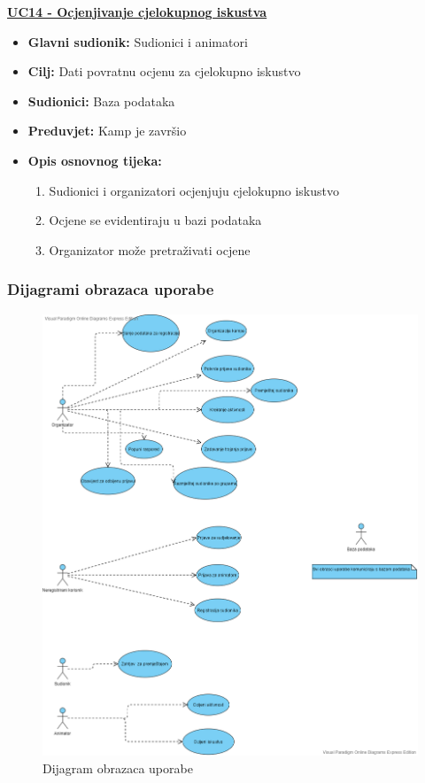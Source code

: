 \noindent \underline{\textbf{UC14 - Ocjenjivanje cjelokupnog iskustva}}
\begin{itemize}
	\item \textbf{Glavni sudionik:} Sudionici i animatori
	\item \textbf{Cilj:} Dati povratnu ocjenu za cjelokupno iskustvo
	\item \textbf{Sudionici:} Baza podataka
	\item \textbf{Preduvjet:} Kamp je završio
	\item \textbf{Opis osnovnog tijeka:} 
	\begin{enumerate}	
		\item Sudionici i organizatori ocjenjuju cjelokupno iskustvo
		\item Ocjene se evidentiraju u bazi podataka
		\item Organizator može pretraživati ocjene\\
	\end{enumerate}
\end{itemize}

\subsubsection{Dijagrami obrazaca uporabe}

\begin{figure}[H]
	\centering
	\includegraphics[scale=0.45]{dijagrami/dijagramObrazacaUporabe.PNG}
	\caption{Dijagram obrazaca uporabe}
\end{figure}
\newpage

